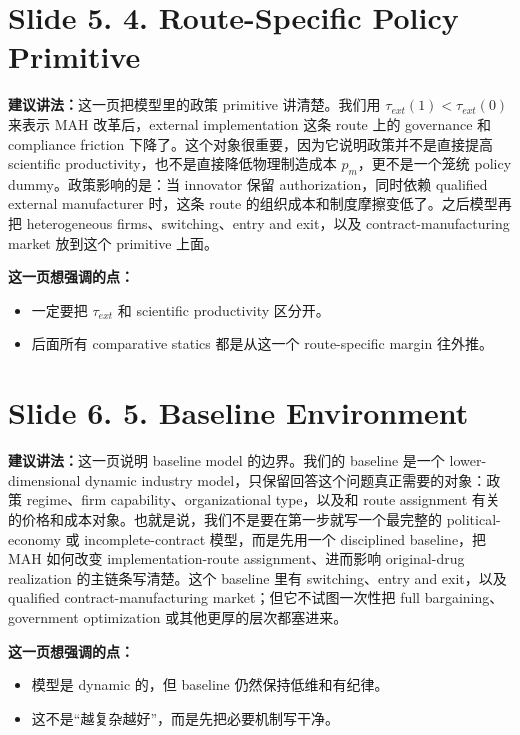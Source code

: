 \documentclass[12pt]{ctexart}
\begin{document}
\newpage
\section*{Slide 5. 4. Route-Specific Policy Primitive}
\textbf{建议讲法：}这一页把模型里的政策 primitive 讲清楚。我们用 $\tau_{ext}(1) < \tau_{ext}(0)$ 来表示 MAH 改革后，external implementation 这条 route 上的 governance 和 compliance friction 下降了。这个对象很重要，因为它说明政策并不是直接提高 scientific productivity，也不是直接降低物理制造成本 $p_m$，更不是一个笼统 policy dummy。政策影响的是：当 innovator 保留 authorization，同时依赖 qualified external manufacturer 时，这条 route 的组织成本和制度摩擦变低了。之后模型再把 heterogeneous firms、switching、entry and exit，以及 contract-manufacturing market 放到这个 primitive 上面。

\vspace{0.5em}
\textbf{这一页想强调的点：}
\begin{itemize}
\item 一定要把 $\tau_{ext}$ 和 scientific productivity 区分开。
\item 后面所有 comparative statics 都是从这一个 route-specific margin 往外推。
\end{itemize}

\newpage
\section*{Slide 6. 5. Baseline Environment}
\textbf{建议讲法：}这一页说明 baseline model 的边界。我们的 baseline 是一个 lower-dimensional dynamic industry model，只保留回答这个问题真正需要的对象：政策 regime、firm capability、organizational type，以及和 route assignment 有关的价格和成本对象。也就是说，我们不是要在第一步就写一个最完整的 political-economy 或 incomplete-contract 模型，而是先用一个 disciplined baseline，把 MAH 如何改变 implementation-route assignment、进而影响 original-drug realization 的主链条写清楚。这个 baseline 里有 switching、entry and exit，以及 qualified contract-manufacturing market；但它不试图一次性把 full bargaining、government optimization 或其他更厚的层次都塞进来。

\vspace{0.5em}
\textbf{这一页想强调的点：}
\begin{itemize}
\item 模型是 dynamic 的，但 baseline 仍然保持低维和有纪律。
\item 这不是“越复杂越好”，而是先把必要机制写干净。
\end{itemize}
\end{document}

